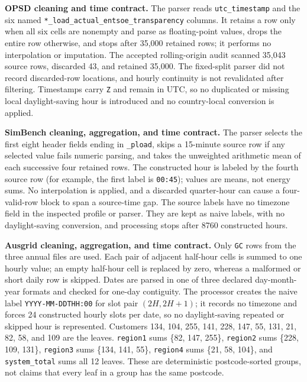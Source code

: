 \documentclass[electronics,article,submit,moreauthors]{Definitions/mdpi}
\begin{document}
\textbf{OPSD cleaning and time contract.} The parser reads \texttt{utc\_timestamp} and the six named \texttt{*\_load\_actual\_entsoe\_transparency} columns. It retains a row only when all six cells are nonempty and parse as floating-point values, drops the entire row otherwise, and stops after 35,000 retained rows; it performs no interpolation or imputation. The accepted rolling-origin audit scanned 35,043 source rows, discarded 43, and retained 35,000. The fixed-split parser did not record discarded-row locations, and hourly continuity is not revalidated after filtering. Timestamps carry \texttt{Z} and remain in UTC, so no duplicated or missing local daylight-saving hour is introduced and no country-local conversion is applied.

\textbf{SimBench cleaning, aggregation, and time contract.} The parser selects the first eight header fields ending in \texttt{\_pload}, skips a 15-minute source row if any selected value fails numeric parsing, and takes the unweighted arithmetic mean of each successive four retained rows. The constructed hour is labeled by the fourth source row (for example, the first label is \texttt{00:45}); values are means, not energy sums. No interpolation is applied, and a discarded quarter-hour can cause a four-valid-row block to span a source-time gap. The source labels have no timezone field in the inspected profile or parser. They are kept as naive labels, with no daylight-saving conversion, and processing stops after 8760 constructed hours.

\textbf{Ausgrid cleaning, aggregation, and time contract.} Only \texttt{GC} rows from the three annual files are used. Each pair of adjacent half-hour cells is summed to one hourly value; an empty half-hour cell is replaced by zero, whereas a malformed or short daily row is skipped. Dates are parsed in one of three declared day-month-year formats and checked for one-day contiguity. The processor creates the naive label \texttt{YYYY-MM-DDTHH:00} for slot pair \((2H,2H+1)\); it records no timezone and forces 24 constructed hourly slots per date, so no daylight-saving repeated or skipped hour is represented. Customers 134, 104, 255, 141, 228, 147, 55, 131, 21, 82, 58, and 109 are the leaves. \texttt{region1} sums \{82, 147, 255\}, \texttt{region2} sums \{228, 109, 131\}, \texttt{region3} sums \{134, 141, 55\}, \texttt{region4} sums \{21, 58, 104\}, and \texttt{system\_total} sums all 12 leaves. These are deterministic postcode-sorted groups, not claims that every leaf in a group has the same postcode.
\end{document}
